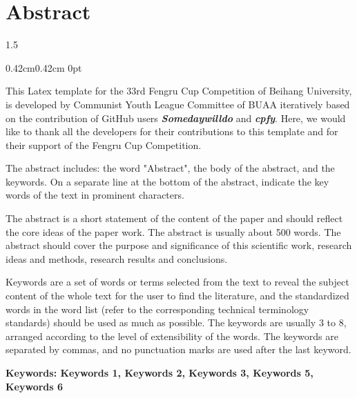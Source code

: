 \documentclass[zihao=-4]{ctexart}
\newcommand{\setParDis}{\setlength {\parskip} {0pt} }
\begin{document}
\section*{\textbf{Abstract}} %
\begin{spacing}{1.5}
\begin{adjustwidth}{0.42cm}{0.42cm}
  \setParDis %

\qquad This Latex template for the 33rd Fengru Cup Competition of 
Beihang University, is developed by Communist Youth League Committee of BUAA 
iteratively based on the contribution of GitHub 
users \textbf{\textit{Somedaywilldo}} and \textbf{\textit{cpfy}}. 
Here, we would like to thank all the developers for their 
contributions to this template and for their support of the Fengru Cup Competition.

The abstract includes: the word "Abstract", the body of the abstract, and the keywords. On a separate line at the bottom of the abstract, indicate the key words of the text in prominent characters.

The abstract is a short statement of the content of the paper and should reflect the core ideas of the paper work. The abstract is usually about 500 words. The abstract should cover the purpose and significance of this scientific work, research ideas and methods, research results and conclusions.

Keywords are a set of words or terms selected from the text to reveal the subject content of the whole text for the user to find the literature, and the standardized words in the word list (refer to the corresponding technical terminology standards) should be used as much as possible. The keywords are usually 3 to 8, arranged according to the level of extensibility of the words. The keywords are separated by commas, and no punctuation marks are used after the last keyword.

\textbf{Keywords: Keywords 1, Keywords 2, Keywords 3, Keywords 5, Keywords 6}
\end{adjustwidth}
\end{spacing}





\clearpage
\tableofcontents
\clearpage



\renewcommand{\headrulewidth}{0.4pt} %
\end{document}
